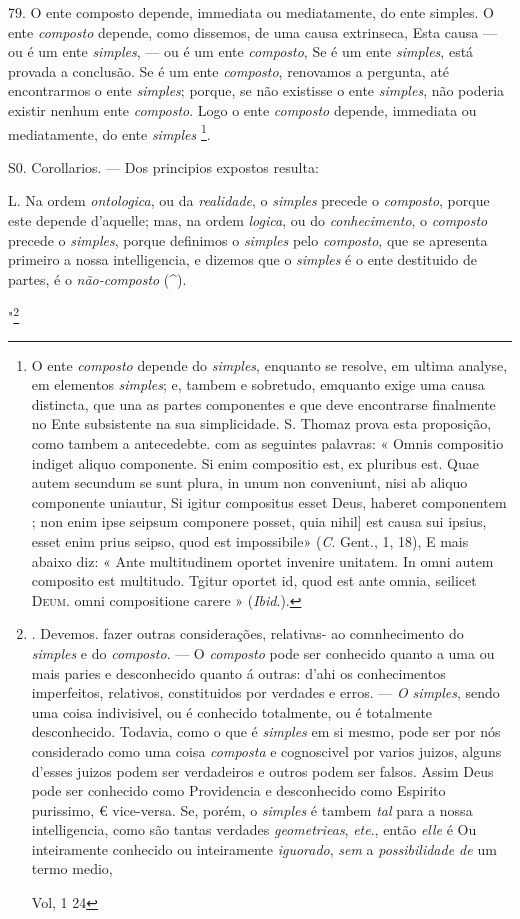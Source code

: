  79. O ente composto depende, immediata ou mediatamente, do ente simples. O ente \emph{composto} depende, como dissemos, de uma causa extrinseca, Esta causa --- ou é um ente \emph{simples}, --- ou é um ente \emph{composto}, Se é um ente \emph{simples}, está provada a conclusão. Se é um ente \emph{composto}, renovamos a pergunta, até encontrarmos o ente \emph{simples}; porque, se não existisse o ente \emph{simples}, não poderia existir nenhum ente \emph{composto}. Logo o ente \emph{composto} depende, immediata ou mediatamente, do ente \emph{simples} \footnote{O ente \emph{composto} depende do \emph{simples}, enquanto se resolve, em ultima analyse, em elementos \emph{simples}; e, tambem e sobretudo, emquanto exige uma causa distincta, que una as partes componentes e que deve encontrarse finalmente no Ente subsistente na sua simplicidade. S. Thomaz prova esta proposição, como tambem a antecedebte. com as seguintes palavras: « Omnis compositio indiget aliquo componente. Si enim compositio est, ex pluribus est. Quae autem secundum se sunt plura, in unum non conveniunt, nisi ab aliquo componente uniautur, Si igitur compositus esset Deus, haberet componentem ; non enim ipse seipsum componere posset, quia nihil] est causa sui ipsius, esset enim prius seipso, quod est impossibile» (\emph{C}. Gent., 1, 18), E mais abaixo diz: « Ante multitudinem oportet invenire unitatem. In omni autem composito est multitudo. Tgitur oportet id, quod est ante omnia, seilicet \textsc{Deum}. omni compositione carere » (\emph{Ibid}.).}.

S0. Corollarios. --- Dos principios expostos resulta:

L. Na ordem \emph{ontologica}, ou da \emph{realidade}, o \emph{simples} precede o \emph{composto}, porque este depende d'aquelle; mas, na ordem \emph{logica}, ou do \emph{conhecimento}, o \emph{composto} precede o \emph{simples}, porque definimos o \emph{simples} pelo \emph{composto}, que se apresenta primeiro a nossa intelligencia, e dizemos que o \emph{simples} é o ente destituido de partes, é o \emph{não-composto} (\textasciicircum{}).

"\footnote{. Devemos. fazer outras considerações, relativas- ao comnhecimento do \emph{simples} e do \emph{composto}. --- O \emph{composto} pode ser conhecido quanto a uma ou mais paries e desconhecido quanto á outras: d'ahi os conhecimentos imperfeitos, relativos, constituidos por verdades e erros. --- \emph{O simples}, sendo uma coisa indivisivel, ou é conhecido totalmente, ou é totalmente desconhecido. Todavia, como o que é \emph{simples} em si mesmo, pode ser por nós considerado como uma coisa \emph{composta} e cognoscivel por varios juizos, alguns d'esses juizos podem ser verdadeiros e outros podem ser falsos. Assim Deus pode ser conhecido como Providencia e desconhecido como Espirito purissimo, € vice-versa. Se, porém, o \emph{simples} é tambem \emph{tal} para a nossa intelligencia, como são tantas verdades \emph{geometrieas}, \emph{ete}., então \emph{elle} é Ou inteiramente conhecido ou inteiramente \emph{iguorado}, \emph{sem} a \emph{possibilidade de} um termo medio,\par Vol, 1 24}

